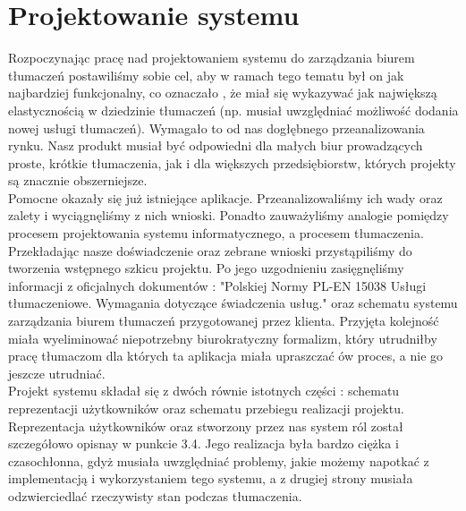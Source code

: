 \documentclass[licencjacka]{pracamgr}
\begin{document}
\section{Projektowanie systemu}
Rozpoczynając pracę nad projektowaniem systemu do zarządzania biurem tłumaczeń postawiliśmy sobie cel, aby w ramach tego tematu był on jak najbardziej funkcjonalny,
co oznaczało , że miał się wykazywać jak największą elastycznością w dziedzinie tłumaczeń (np. musiał uwzględniać możliwość dodania nowej usługi tłumaczeń). 
Wymagało to od nas dogłębnego przeanalizowania rynku. Nasz produkt musiał być odpowiedni dla małych biur prowadzących proste, krótkie tłumaczenia, jak i dla większych 
przedsiębiorstw, których projekty są znacznie obszerniejsze.\\

Pomocne okazały się już istniejące aplikacje. Przeanalizowaliśmy ich wady oraz zalety i wyciągnęliśmy z nich wnioski. Ponadto zauważyliśmy analogie pomiędzy procesem projektowania
systemu informatycznego, a procesem tłumaczenia. Przekładając nasze doświadczenie oraz zebrane wnioski przystąpiliśmy do tworzenia wstępnego szkicu projektu. 
Po jego uzgodnieniu zasięgnęliśmy informacji z oficjalnych dokumentów : "Polskiej Normy PL-EN 15038 Usługi tłumaczeniowe. Wymagania dotyczące świadczenia usług." oraz
schematu systemu zarządzania biurem tłumaczeń przygotowanej przez klienta.
Przyjęta kolejność miała wyeliminować niepotrzebny biurokratyczny formalizm, który utrudniłby pracę tłumaczom dla których ta aplikacja miała upraszczać ów proces, a nie go jeszcze utrudniać.\\

Projekt systemu składał się z dwóch równie istotnych części : schematu reprezentacji użytkowników oraz schematu przebiegu realizacji projektu.\\

Reprezentacja użytkowników oraz stworzony przez nas system ról został szczegółowo opisnay w punkcie 3.4. 
Jego realizacja była bardzo ciężka i czasochłonna, gdyż musiała uwzględniać problemy, jakie możemy napotkać z implementacją i wykorzystaniem tego systemu, 
a z drugiej strony musiała odzwierciedlać rzeczywisty stan podczas tłumaczenia.\\
\end{document}
